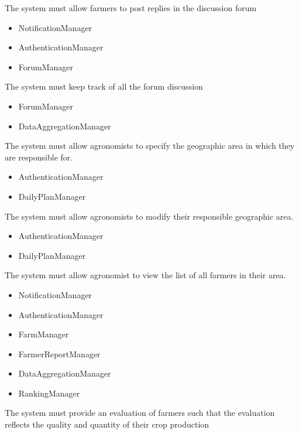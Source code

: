 \begin{itemize}
\begin{itemize}
\end{itemize}
  The system must allow farmers to post replies in the discussion forum
\begin{itemize}

\item NotificationManager
\item AuthenticationManager
\item ForumManager

\end{itemize}

  The system must keep track of all the forum discussion
\begin{itemize}


\item ForumManager
\item DataAggregationManager

\end{itemize}

 The system must allow agronomists to specify the geographic area in which they are responsible for.
\begin{itemize}

\item AuthenticationManager
\item DailyPlanManager

\end{itemize}

 The system must allow agronomists to modify their responsible geographic area.
\begin{itemize}


\item AuthenticationManager
\item DailyPlanManager

\end{itemize}

  The system must allow agronomist to view the list of all farmers in their area.
\begin{itemize}

\item NotificationManager
\item AuthenticationManager
\item FarmManager
\item FarmerReportManager
\item DataAggregationManager
\item RankingManager

\end{itemize}
  The system must provide an evaluation of farmers such that the evaluation reflects the quality and quantity of their crop production
\begin{itemize}



\end{itemize}
\end{itemize}
